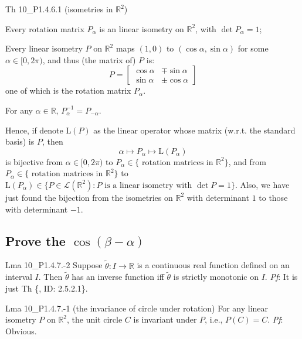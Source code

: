 \documentclass{article}
\begin{document}
\begin{Th}{Th 10\_P1.4.6.1 (isometries in $\mathbb{R}^2$)}
    \begin{compactenum}
        \item Every rotation matrix $P_\alpha$ is an linear isometry on $\mathbb{R}^2$, with $\det P_\alpha = 1$;
        \item Every linear isometry $P$ on $\mathbb{R}^2$ maps $(1,0)$ to $(\cos\alpha, \sin\alpha)$ for some $\alpha\in [0, 2\pi)$, and thus (the matrix of) $P$ is:
        $$ P = \begin{bmatrix}
            \cos\alpha & \mp\sin\alpha \\
            \sin\alpha & \pm\cos\alpha
        \end{bmatrix} $$
        one of which is the rotation matrix $P_\alpha$.
        \item For any $\alpha\in\mathbb{R}$, $P_\alpha^{-1} = P_{-\alpha}$.
    \end{compactenum}
    Hence, if denote $\mathrm{L}(P)$ as the linear operator whose matrix (w.r.t. the standard basis) is $P$, then
    $$ \alpha\mapsto P_\alpha \mapsto \mathrm{L}(P_\alpha) $$
    is bijective from $\alpha\in [0, 2\pi)$ to $P_\alpha\in \{\text{ rotation matrices in }\mathbb{R}^2\}$, and from $P_\alpha\in \{\text{ rotation matrices in }\mathbb{R}^2\}$ to $\mathrm{L}(P_\alpha)\in\{P\in\mathcal{L}(\mathbb{R}^2): P \text{ is a linear isometry with }\det P = 1\}$. Also, we have just found the bijection from the isometries on $\mathbb{R}^2$ with determinant $1$ to those with determinant $-1$.
\end{Th}

\subsection{Prove the $\cos (\beta - \alpha)$}

\begin{Th}{Lma 10\_P1.4.7.-2}
    Suppose $\tilde{\theta}: I\rightarrow \mathbb{R}$ is a continuous real function defined on an interval $I$. Then $\tilde{\theta}$ has an inverse function iff $\tilde{\theta}$ is strictly monotonic on $I$.
    \tcblower
    \textit{Pf}: It is just Th \{, ID: 2.5.2.1\}.
\end{Th}

\begin{Th}{Lma 10\_P1.4.7.-1 (the invariance of circle under rotation)}
    For any linear isometry $P$ on $\mathbb{R}^2$, the unit circle $C$ is invariant under $P$, i.e., $P(C) = C$.
    \tcblower
    \textit{Pf}: Obvious.
\end{Th}
\end{document}

